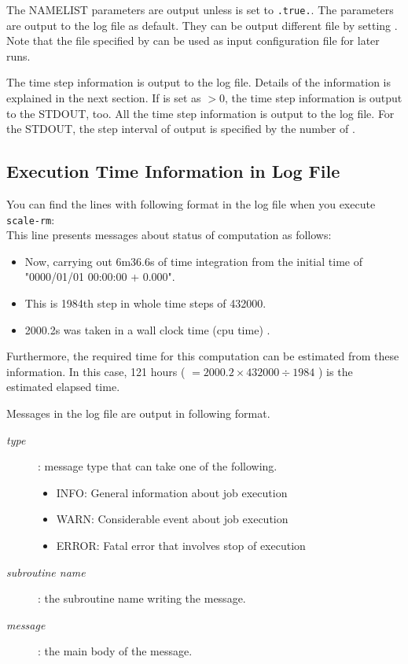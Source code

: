 The NAMELIST parameters are output unless  is set to \verb|.true.|.
The parameters are output to the log file as default.
They can be output different file by setting .
Note that the file specified by  can be used as input configuration file for later runs.

The time step information is output to the log file.
Details of the information is explained in the next section.
If  is set as $>0$, the time step information is output to the STDOUT, too.
All the time step information is output to the log file. For the STDOUT, the step interval of output is specified by the number of .



\subsection{Execution Time Information in Log File}

You can find the lines with following format in the log file when you execute \verb|scale-rm|:\\
This line presents messages about status of computation as follows:
\begin{itemize}
 \item Now, carrying out 6m36.6s of time integration from the initial time of "0000/01/01 00:00:00 + 0.000".
 \item This is 1984th step in whole time steps of 432000.
 \item 2000.2s was taken in a wall clock time (cpu time) .
\end{itemize}
Furthermore, the required time for this computation can be estimated from these information.
In this case, 121 hours ( $= 2000.2 \times 432000 \div 1984$ ) is the estimated elapsed time.

\vspace{2ex}
Messages in the log file are output in following format.
\begin{description}
 \item[{\it type}]: message type that can take one of the following.
   \begin{itemize}
    \item INFO: General information about job execution
    \item WARN: Considerable event about job execution
    \item ERROR: Fatal error that involves stop of execution
   \end{itemize}
 \item[{\it subroutine name}]: the subroutine name writing the message.
 \item[{\it message}]: the main body of the message.
\end{description}



